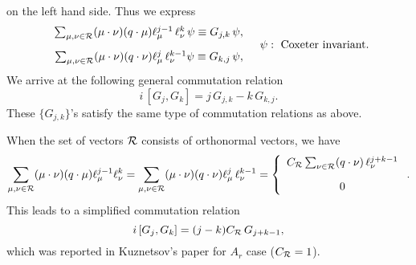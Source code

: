 \documentclass[a4paper,12pt]{article}
\begin{document}
on the left hand side.
Thus we express
\begin{equation}
\begin{array}{r}
\sum_{\mu,\nu\in{\cal R}}
(\mu\cdot\nu)(q\cdot\mu)
   \ell_\mu^{j-1}\,\ell_\nu^{k}\,\psi\equiv G_{j,k}\,\psi,\\[10pt]
\sum_{\mu,\nu\in{\cal R}}
(\mu\cdot\nu)  (q\cdot\nu)
   \ell_\mu^{j}\,\ell_\nu^{k-1}\psi\equiv G_{k,j}\,\psi,
\end{array}
\quad \psi:\ \mbox{Coxeter invariant}.
\label{gjkdef}
\end{equation}
We arrive at the following general commutation relation
\begin{equation}
i\,[G_j,G_k]=j\,G_{j,k}-k\,G_{k,j}.
\end{equation}
These $\{G_{j,k}\}$'s satisfy the same type of commutation relations as
above.

When the set of vectors ${\cal R}$ consists of orthonormal vectors,
we have
\begin{equation}
\sum_{\mu,\nu\in{\cal R}}
(\mu\cdot\nu)(q\cdot\mu)\ell_\mu^{j-1}\ell^k_\nu=
\sum_{\mu,\nu\in{\cal R}}
(\mu\cdot\nu)  (q\cdot\nu)
   \ell_\mu^{j}\,\ell_\nu^{k-1}=
\left\{\begin{array}{c}
C_{\cal R}\sum_{\nu\in{\cal R}}(q\cdot\nu)\,
\ell_\nu^{j+k-1}\\[10pt]
0
\end{array}
\right. .
\end{equation}
This leads to a simplified commutation relation
\begin{equation}
i\,[G_j,G_k]=(j-k)C_{\cal R}\,G_{j+k-1},
\label{ggsimp}
\end{equation}
which was reported in Kuznetsov's paper for $A_r$ case \cite{Kuz}
($C_{\cal R}=1$).
\end{document}
